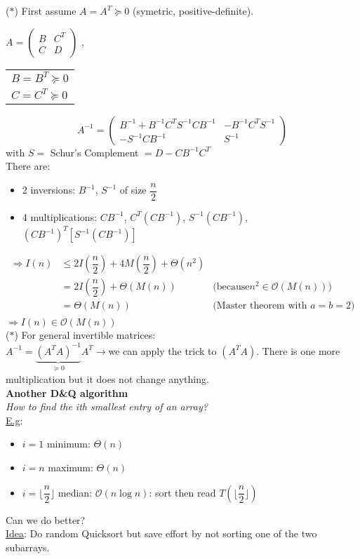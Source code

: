 \documentclass[12pt,a4paper]{report}
\theoremstyle{break}
\begin{document}
($\ast$)  First assume $A=A^T\succcurlyeq 0$ (symetric, positive-definite).\\
\begin{center}
$A=\begin{pmatrix}
B & C^T\\
C & D
\end{pmatrix}$ \hspace*{1cm},\hspace*{1cm}
\begin{tabular}{l}
$B=B^T\succcurlyeq 0$\\
$C=C^T\succcurlyeq 0$
\end{tabular}
\end{center}
$$A^{-1}=\begin{pmatrix}
B^{-1}+B^{-1}C^TS^{-1}CB^{-1} & -B^{-1}C^TS^{-1}\\
-S^{-1}CB^{-1} & S^{-1}
\end{pmatrix}$$
with $S=$ Schur's Complement $=D-CB^{-1}C^T$\\
There are:
\begin{itemize}
\item 2 inversions: $B^{-1}$, $S^{-1}$ of size $\dfrac{n}{2}$
\item 4 multiplications: $CB^{-1}$, $C^T (CB^{-1})$, $S^{-1}(CB^{-1})$, $(CB^{-1})^T\left[S^{-1}(CB^{-1})\right]$
\end{itemize}
\begin{align*}
\Rightarrow I(n) &\leq 2I(\dfrac{n}{2})+4M(\dfrac{n}{2})+\Theta(n^2)&\\
&=2I\left(\dfrac{n}{2}\right)+\Theta(M(n))&\text{(because}n^2\in \mathcal{O}(M(n)))\\
&=\Theta(M(n))&\text{(Master theorem with } a=b=2)\\
\end{align*}
$\Rightarrow I(n)\in \mathcal{O}(M(n))$\\

($\ast$) For general invertible matrices:\\
\hspace*{2cm} $A^{-1}=\underbrace{(A^TA)^{-1}}\limits_{\succcurlyeq 0}A^T\rightarrow$we can apply the trick to $(A^TA)$. There is one more multiplication but it does not change anything.\\



\textbf{Another D\&Q algorithm}\\
\textit{How to find the ith smallest entry of an array?}\\
\underline{E.g}:
\begin{itemize}
\item $i=1$   minimum: $\Theta(n)$
\item $i=n$   maximum: $\Theta(n)$
\item $i=\lfloor \dfrac{n}{2}\rfloor$ median: $\mathcal{O}(n\log n)$: sort then read $T(\lfloor \dfrac{n}{2}\rfloor)$
\end{itemize}
Can we do better?\\
\underline{Idea}: Do random Quicksort but save effort by not sorting one of the two subarrays.\\
\end{document}
